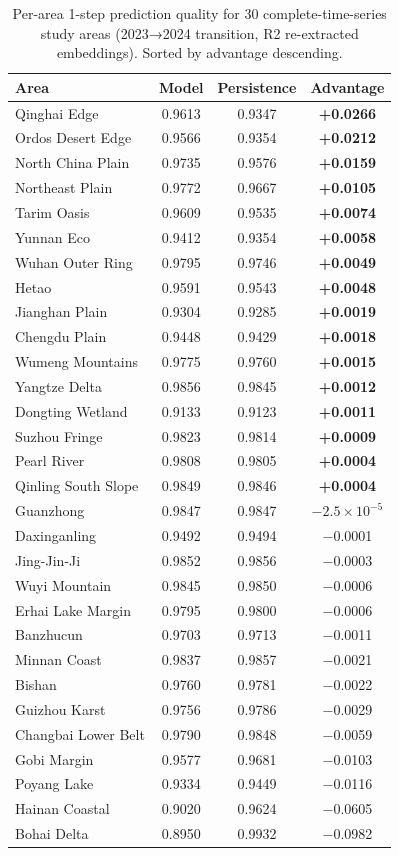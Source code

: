 \documentclass{article}
\begin{document}
\begin{table}[htbp]
\centering
\caption{Per-area 1-step prediction quality for 30 complete-time-series study areas (2023→2024 transition, R2 re-extracted embeddings). Sorted by advantage descending.}
\label{tab:perarea}
\small
\begin{tabular}{lccc}
\toprule
Area & Model & Persistence & Advantage \\
\midrule
Qinghai Edge & 0.9613 & 0.9347 & \textbf{+0.0266} \\
Ordos Desert Edge & 0.9566 & 0.9354 & \textbf{+0.0212} \\
North China Plain & 0.9735 & 0.9576 & \textbf{+0.0159} \\
Northeast Plain & 0.9772 & 0.9667 & \textbf{+0.0105} \\
Tarim Oasis & 0.9609 & 0.9535 & \textbf{+0.0074} \\
Yunnan Eco & 0.9412 & 0.9354 & \textbf{+0.0058} \\
Wuhan Outer Ring & 0.9795 & 0.9746 & \textbf{+0.0049} \\
Hetao & 0.9591 & 0.9543 & \textbf{+0.0048} \\
Jianghan Plain & 0.9304 & 0.9285 & \textbf{+0.0019} \\
Chengdu Plain & 0.9448 & 0.9429 & \textbf{+0.0018} \\
Wumeng Mountains & 0.9775 & 0.9760 & \textbf{+0.0015} \\
Yangtze Delta & 0.9856 & 0.9845 & \textbf{+0.0012} \\
Dongting Wetland & 0.9133 & 0.9123 & \textbf{+0.0011} \\
Suzhou Fringe & 0.9823 & 0.9814 & \textbf{+0.0009} \\
Pearl River & 0.9808 & 0.9805 & \textbf{+0.0004} \\
Qinling South Slope & 0.9849 & 0.9846 & \textbf{+0.0004} \\
Guanzhong & 0.9847 & 0.9847 & $-2.5\times10^{-5}$ \\
Daxinganling & 0.9492 & 0.9494 & $-$0.0001 \\
Jing-Jin-Ji & 0.9852 & 0.9856 & $-$0.0003 \\
Wuyi Mountain & 0.9845 & 0.9850 & $-$0.0006 \\
Erhai Lake Margin & 0.9795 & 0.9800 & $-$0.0006 \\
Banzhucun & 0.9703 & 0.9713 & $-$0.0011 \\
Minnan Coast & 0.9837 & 0.9857 & $-$0.0021 \\
Bishan & 0.9760 & 0.9781 & $-$0.0022 \\
Guizhou Karst & 0.9756 & 0.9786 & $-$0.0029 \\
Changbai Lower Belt & 0.9790 & 0.9848 & $-$0.0059 \\
Gobi Margin & 0.9577 & 0.9681 & $-$0.0103 \\
Poyang Lake & 0.9334 & 0.9449 & $-$0.0116 \\
Hainan Coastal & 0.9020 & 0.9624 & $-$0.0605 \\
Bohai Delta & 0.8950 & 0.9932 & $-$0.0982 \\
\bottomrule
\end{tabular}
\end{table}
\end{document}
